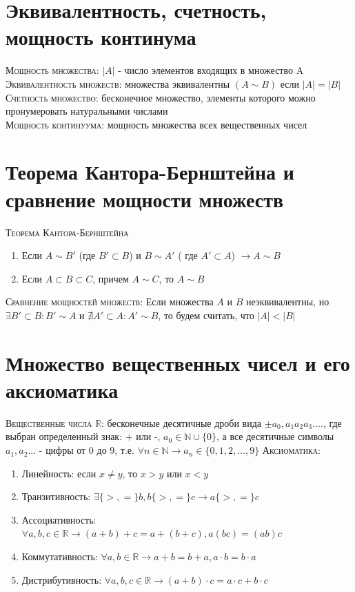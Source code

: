\documentclass[14pt]{article}
\begin{document}
    \section{Эквивалентность, счетность, мощность континума}    
        \textsc{Мощность множества: } $|A|$ - число элементов входящих в множество A \\   
        \textsc{Эквивалентность множеств:} множества эквивалентны $(A \sim B)$ если $|A| = |B|$ \\
        \textsc{Счетность множество: } бесконечное множество, элементы которого можно пронумеровать натуральными числами \\
        \textsc{Мощность континуума: } мощность множества всех вещественных чисел 
 
    \section{Теорема Кантора-Бернштейна и сравнение мощности множеств}  
        \textsc{Теорема Кантора-Бернштейна} 
        \begin{enumerate}
            \item Если $A \sim B'$ (где $B' \subset B$) и $B \sim A'$ ( где $A' \subset A $) $\rightarrow A \sim B$    
            \item Если $A \subset B \subset C$, причем $A \sim C$, то $A \sim B$
        \end{enumerate}
        \textsc{Сравнение мощностей множеств:} Если множества $A$ и $B$ неэквивалентны, но $\exists B' \subset B: B' \sim A $ и $\nexists  A' \subset A: A' \sim B$, то будем считать, что $|A|<|B|$

    \section{Множество вещественных чисел и его аксиоматика}
        \textsc{Вещественные числа $\mathbb{R}$:} бесконечные десятичные дроби вида $\pm a_0,a_1a_2a_3....$, где выбран определенный знак: + или -, $a_0 \in \mathbb{N} \cup \{0\}$, а все десятичные символы $a_1, a_2...$ - цифры от 0 до 9, т.е. $\forall n \in \mathbb{N} \rightarrow a_n \in \{0,1,2,...,9\}$
        \textsc{Аксиоматика: }
            \begin{enumerate}
                \item Линейность: если $x \neq y$, то $x > y$ или $x < y$
                \item Транзитивность: $\exists\{ >,= \}b, b\{ >,= \}c\rightarrow a\{>,=\}c$
                \item Ассоциативность: $\forall a, b, c \in \mathbb{R} \rightarrow (a+b)+c = a+(b+c), a(bc) = (ab)c$
                \item Коммутативность: $\forall a,b \in \mathbb{R} \rightarrow a+b=b+a, a\cdot b = b\cdot a $
                \item Дистрибутивность: $\forall a,b,c \in \mathbb{R} \rightarrow (a+b)\cdot c = a \cdot c + b \cdot c$
            \end{enumerate}
\end{document}

